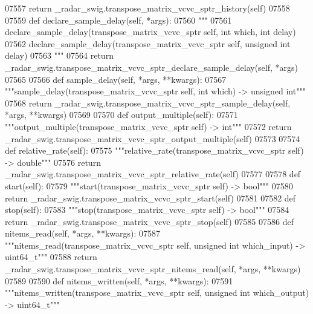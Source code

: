 \begin{DoxyCode}
{{{{{{{{{{{{{{{{{{{{{{{{{07557         \textcolor{keywordflow}{return} \_radar\_swig.transpose\_matrix\_vcvc\_sptr\_history(self)
07558 
07559     \textcolor{keyword}{def }declare_sample_delay(self, *args):
07560         \textcolor{stringliteral}{"""}
07561 \textcolor{stringliteral}{        declare\_sample\_delay(transpose\_matrix\_vcvc\_sptr self, int which, int delay)}
07562 \textcolor{stringliteral}{        declare\_sample\_delay(transpose\_matrix\_vcvc\_sptr self, unsigned int delay)}
07563 \textcolor{stringliteral}{        """}
07564         \textcolor{keywordflow}{return} \_radar\_swig.transpose\_matrix\_vcvc\_sptr\_declare\_sample\_delay(self, *args)
07565 
07566     \textcolor{keyword}{def }sample_delay(self, *args, **kwargs):
07567         \textcolor{stringliteral}{"""sample\_delay(transpose\_matrix\_vcvc\_sptr self, int which) -> unsigned int"""}
07568         \textcolor{keywordflow}{return} \_radar\_swig.transpose\_matrix\_vcvc\_sptr\_sample\_delay(self, *args, **kwargs)
07569 
07570     \textcolor{keyword}{def }output_multiple(self):
07571         \textcolor{stringliteral}{"""output\_multiple(transpose\_matrix\_vcvc\_sptr self) -> int"""}
07572         \textcolor{keywordflow}{return} \_radar\_swig.transpose\_matrix\_vcvc\_sptr\_output\_multiple(self)
07573 
07574     \textcolor{keyword}{def }relative_rate(self):
07575         \textcolor{stringliteral}{"""relative\_rate(transpose\_matrix\_vcvc\_sptr self) -> double"""}
07576         \textcolor{keywordflow}{return} \_radar\_swig.transpose\_matrix\_vcvc\_sptr\_relative\_rate(self)
07577 
07578     \textcolor{keyword}{def }start(self):
07579         \textcolor{stringliteral}{"""start(transpose\_matrix\_vcvc\_sptr self) -> bool"""}
07580         \textcolor{keywordflow}{return} \_radar\_swig.transpose\_matrix\_vcvc\_sptr\_start(self)
07581 
07582     \textcolor{keyword}{def }stop(self):
07583         \textcolor{stringliteral}{"""stop(transpose\_matrix\_vcvc\_sptr self) -> bool"""}
07584         \textcolor{keywordflow}{return} \_radar\_swig.transpose\_matrix\_vcvc\_sptr\_stop(self)
07585 
07586     \textcolor{keyword}{def }nitems_read(self, *args, **kwargs):
07587         \textcolor{stringliteral}{"""nitems\_read(transpose\_matrix\_vcvc\_sptr self, unsigned int which\_input) -> uint64\_t"""}
07588         \textcolor{keywordflow}{return} \_radar\_swig.transpose\_matrix\_vcvc\_sptr\_nitems\_read(self, *args, **kwargs)
07589 
07590     \textcolor{keyword}{def }nitems_written(self, *args, **kwargs):
07591         \textcolor{stringliteral}{"""nitems\_written(transpose\_matrix\_vcvc\_sptr self, unsigned int which\_output) -> uint64\_t"""}
}}}}}}}}}}}}}}}}}}}}}}}}}
\end{DoxyCode}
